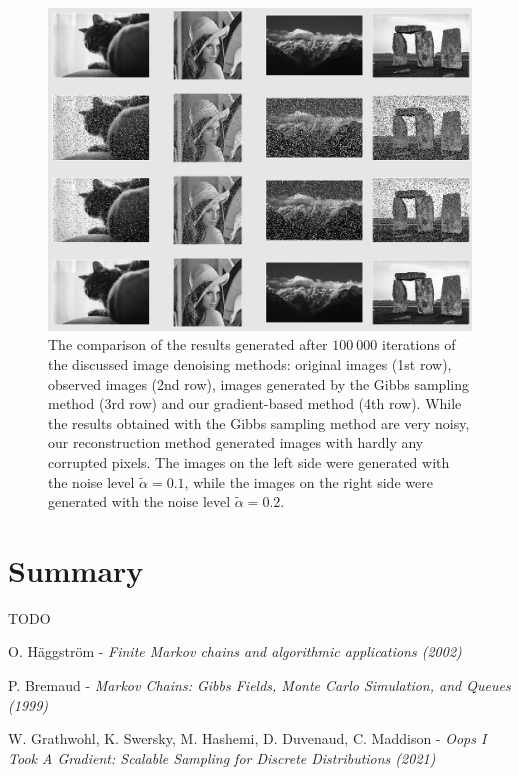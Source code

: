 \documentclass[a4paper, 11pt, onecolumn, openany, titlepage]{report}
\newcommand\numberedchapter[1]{\setlength\topskip{3cm}\chapter{#1}\setlength\topskip{0cm}}
\theoremstyle{default_theorem_style}\newtheorem{theorem}{Theorem}
\theoremstyle{default_theorem_style}\newtheorem{definition}{Definition}
\begin{document}
\begin{figure}[H]
\centering
\includegraphics[scale=0.42]{grayscale_qualitative_results}
\caption{The comparison of the results generated after $100\ 000$ iterations of the discussed image denoising
methods: original images (1st row), observed images (2nd row), images generated by the Gibbs
sampling method (3rd row) and our gradient-based method (4th row). While the results obtained with the Gibbs
sampling method are very noisy, our reconstruction method generated images with hardly any corrupted pixels. The
images on the left side were generated with the noise level $\tilde{\alpha} = 0.1$, while the images on the right
side were generated with the noise level $\tilde{\alpha} = 0.2$.}
\label{fig:grayscale_qualitative_results}
\end{figure}

\numberedchapter{Summary}

TODO


\begin{thebibliography}{9}

O. Häggström - \textit{Finite Markov chains and algorithmic applications (2002)}

P. Bremaud - \textit{Markov Chains: Gibbs Fields, Monte Carlo Simulation, and Queues (1999)}

W. Grathwohl, K. Swersky, M. Hashemi, D. Duvenaud, C. Maddison -
\textit{Oops I Took A Gradient: Scalable Sampling for Discrete Distributions (2021)}

\end{thebibliography}
\end{document}
